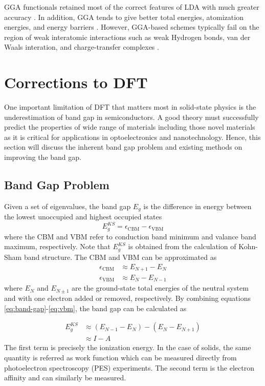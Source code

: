 GGA functionals retained most of the correct features of LDA with much greater accuracy \citep{Burke1997}. In addition, GGA tends to give better total energies, atomization energies, and energy barriers \citep{Becke1988,Langreth1983,Perdew1992a,Proynov1995}. However, GGA-based schemes typically fail on the region of weak interatomic interactions such as weak Hydrogen bonds, van der Waals interation, and charge-transfer complexes \citep{Kim1994,PerezJorda1995,Ruiz1995}.

\section{Corrections to DFT}
One important limitation of DFT that matters most in solid-state physics is the underestimation of band gap in semiconductors. A good theory must successfully predict the  properties of wide range of materials including those novel materials as it is critical for applications in optoelectronics and nanotechnology. Hence, this section will discuss the inherent band gap problem and existing methods on improving the band gap.   

\subsection{Band Gap Problem}
Given a set of eigenvalues, the band gap $E_g$ is the difference in energy between the lowest unoccupied and highest occupied states
\begin{equation} \label{eq:band-gap}
	E_g^{KS} = \epsilon_{\text{CBM}} - \epsilon_{\text{VBM}}
\end{equation}
where the CBM and VBM refer to conduction band minimum and valance band maximum, respectively. Note that $E_g^{KS}$ is obtained from the calculation of Kohn-Sham band structure. The CBM and VBM can be approximated as 
\begin{align}
	\epsilon_{\text{CBM}} &\approx E_{N + 1} - E_{N} \label{eq:cbm}	\\
	\epsilon_{\text{VBM}} &\approx E_{N} - E_{N - 1}	\label{eq:vbm}
\end{align}
where $E_{N}$ and $E_{N \pm 1}$ are the ground-state total energies of the neutral system and with one electron added or removed, respectively. By combining equations \eqref{eq:band-gap}-\eqref{eq:vbm}, the band gap can be calculated as \citep{MoriSanchez2008}

\begin{align} \label{eq:band-gap1}
	E_g^{KS} &\approx (E_{N - 1} - E_{N} )  - (E_{N} - E_{N + 1}) \\
	&\approx I - A \nonumber
\end{align}
The first term is precisely the ionization energy. In the case of solids, the same quantity is referred as work function which can be measured directly from photoelectron spectroscopy (PES) experiments. The second term is the electron affinity and can similarly be measured. 

